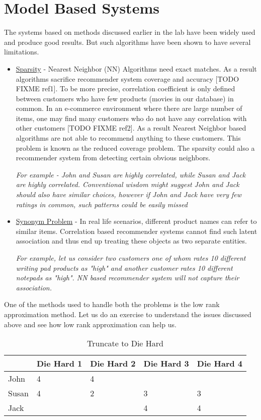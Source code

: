\section{Model Based Systems}
  The systems based on methods discussed earlier in the lab have been widely used and produce good results. But such algorithms have been shown to have several limitations. 
  \begin{itemize}
    \item \underline{Sparsity} - Nearest Neighbor (NN) Algorithms need exact matches. As a result algorithms sacrifice recommender system coverage and accuracy [TODO FIXME ref1]. To be more precise, correlation coefficient is only defined between customers who have few products (movies in our database) in common. In an e-commerce environment where there are large number of items, one may find many customers who do not have any correlation with other customers [TODO FIXME ref2]. As a result Nearest Neighbor based algorithms are not able to recommend anything to these customers. This problem is known as the reduced coverage problem. The sparsity could also a recommender system from detecting certain obvious neighbors. 

\textit{For example - John and Susan are highly correlated, while Susan and Jack are highly correlated. Conventional wisdom might suggest John and Jack should also have similar choices, however if John and Jack have very few ratings in common, such patterns could be easily missed}
    \item \underline{Synonym Problem} - In real life scenarios, different product names can refer to similar items. Correlation based recommender systems cannot find such latent association and thus end up treating these objects as two separate entities. 

\textit{For example, let us consider two customers one of whom rates 10 different writing pad products as "high" and another customer rates 10 different notepads as "high". NN based recommender system will not capture their association.}
  \end{itemize}
  One of the methods used to handle both the problems is the low rank approximation method. Let us do an exercise to understand the issues discussed above and see how low rank approximation can help us. \\
  \begin{table}[]
  \centering
  \label{my-label}
  \begin{tabular}{|l|l|l|l|l|}
  \hline
      & Die Hard 1 & Die Hard 2 & Die Hard 3 & Die Hard 4 \\ \hline
John  & 4          & 4          &            &            \\ \hline
Susan & 4          & 2          & 3          & 3          \\ \hline
Jack  &            &            & 4          & 4          \\ \hline
  \end{tabular}
  \caption{Truncate to Die Hard}
  \label{Model-1}
  \end{table}
